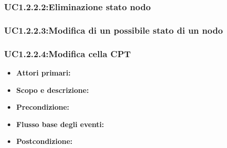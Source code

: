\subsubsection{UC1.2.2.2:Eliminazione stato nodo}
\subsubsection{UC1.2.2.3:Modifica di un possibile stato di un nodo}
\subsubsection{UC1.2.2.4:Modifica cella CPT}

\begin{itemize}
	\item{\textbf{Attori primari:}}
	\item{\textbf{Scopo e descrizione:}}
	\item{\textbf{Precondizione:}}
	\item{\textbf{Flusso base degli eventi:}}

	\item{\textbf{Postcondizione:}}
\end{itemize}